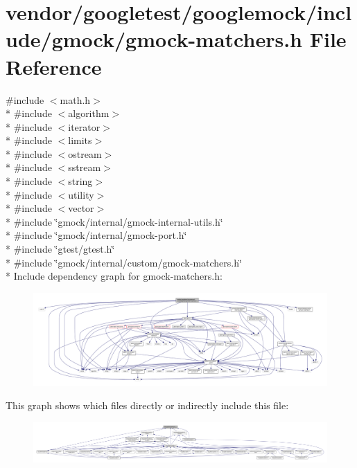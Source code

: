 \hypertarget{gmock-matchers_8h}{}\section{vendor/googletest/googlemock/include/gmock/gmock-\/matchers.h File Reference}
\label{gmock-matchers_8h}
{\ttfamily \#include $<$math.\+h$>$}\\*
{\ttfamily \#include $<$algorithm$>$}\\*
{\ttfamily \#include $<$iterator$>$}\\*
{\ttfamily \#include $<$limits$>$}\\*
{\ttfamily \#include $<$ostream$>$}\\*
{\ttfamily \#include $<$sstream$>$}\\*
{\ttfamily \#include $<$string$>$}\\*
{\ttfamily \#include $<$utility$>$}\\*
{\ttfamily \#include $<$vector$>$}\\*
{\ttfamily \#include \char`\"{}gmock/internal/gmock-\/internal-\/utils.\+h\char`\"{}}\\*
{\ttfamily \#include \char`\"{}gmock/internal/gmock-\/port.\+h\char`\"{}}\\*
{\ttfamily \#include \char`\"{}gtest/gtest.\+h\char`\"{}}\\*
{\ttfamily \#include \char`\"{}gmock/internal/custom/gmock-\/matchers.\+h\char`\"{}}\\*
Include dependency graph for gmock-\/matchers.h\+:\nopagebreak
\begin{figure}[H]
\begin{center}
\leavevmode
\includegraphics[width=350pt]{gmock-matchers_8h__incl}
\end{center}
\end{figure}
This graph shows which files directly or indirectly include this file\+:\nopagebreak
\begin{figure}[H]
\begin{center}
\leavevmode
\includegraphics[width=350pt]{gmock-matchers_8h__dep__incl}
\end{center}
\end{figure}
